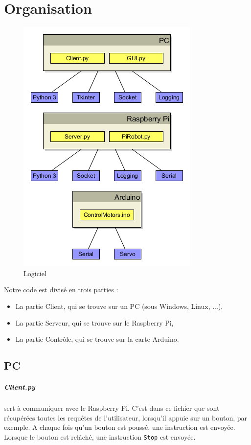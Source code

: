 \documentclass[12pt,a4paper]{report}
\begin{document}
\chapter{Organisation}

\begin{figure}[hf!]
\center
\includegraphics[scale=0.6]{images/GraphLogiciel.png}
\caption{Logiciel}
\end{figure}

Notre code est divisé en trois parties :

\bigbreak

\begin{itemize}
\item La partie Client, qui se trouve sur un PC (sous Windows, Linux, ...),
\item La partie Serveur, qui se trouve sur le Raspberry Pi,
\item La partie Contrôle, qui se trouve sur la carte Arduino.
\end{itemize}

\section{PC}

\paragraph{Client.py} sert à communiquer avec le Raspberry Pi. C'est dans ce fichier que sont récupérées toutes les requêtes de l'utilisateur, lorsqu'il appuie sur un bouton, par exemple. A chaque fois qu'un bouton est poussé, une instruction est envoyée. Lorsque le bouton est relâché, une instruction \verb=Stop= est envoyée.
\end{document}

